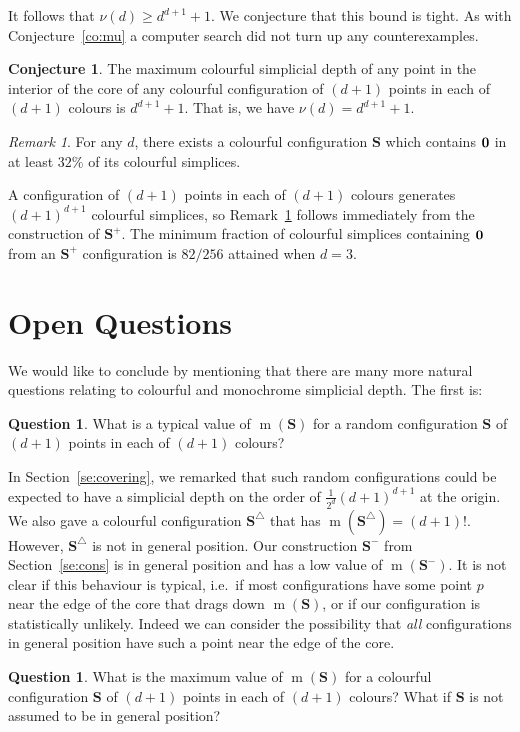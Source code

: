 \documentclass[epsbox,12pt,reqno]{amsart}
\theoremstyle{definition}
\newtheorem{question}[theorem]{Question}
\newtheorem{conjecture}[theorem]{Conjecture}
\theoremstyle{remark}
\newtheorem{remark}[theorem]{Remark}
\def\S{\mathbf{S}}
\def\m{\operatorname{m}}
\def\zero{{\bf 0}}
\begin{document}
It follows that $\nu(d) \ge d^{d+1}+1$. 
We conjecture that this bound is tight.
As with Conjecture~\ref{co:mu} a computer search did not turn up
any counterexamples.
\begin{conjecture}\label{co:nu}
The maximum colourful simplicial depth of any point in the
interior of the core of any colourful configuration of
$(d+1)$ points in each of $(d+1)$ colours is $d^{d+1}+1$.
That is, we have $\nu(d)=d^{d+1}+1$. 
\end{conjecture}

\begin{remark}\label{re:32}
For any $d$, there exists a colourful configuration $\S$ 
which contains $\zero$ in at least $32\%$ of its colourful simplices.
\end{remark}
A configuration of $(d+1)$ points in each of $(d+1)$ colours 
generates $(d+1)^{d+1}$ colourful
simplices, so Remark~\ref{re:32} follows immediately from 
the construction of $\S^+$.  The minimum fraction of colourful
simplices containing $\zero$ from an $\S^+$ configuration is $82/256$ 
attained when $d=3$.

%
%
\section{Open Questions}
We would like to conclude by mentioning that there are many more
natural questions relating to colourful and monochrome simplicial depth.
The first is:
\begin{question}\label{q:mavg}
What is a typical value of $\m(\S)$ for a random 
configuration $\S$ of $(d+1)$ points in each of $(d+1)$ colours?  
\end{question}
In Section~\ref{se:covering}, we remarked that such random
configurations could be expected to have a simplicial depth
on the order of $\frac{1}{2^d}(d+1)^{d+1}$ at the origin.  
We also gave a colourful configuration 
$\S^\triangle$ that has $\m(\S^\triangle)=(d+1)!$.  
However, $\S^\triangle$ is not in general position.  
Our construction $\S^\minus$ from Section~\ref{se:cons} is 
in general position and has a low value of $\m(\S^\minus)$.
It is not clear if this behaviour is typical, 
i.e.~if most configurations have some point $p$ near the edge of
the core that drags down $\m(\S)$, or if our configuration is
statistically unlikely.  Indeed we can consider the
possibility that {\it all} configurations in general position 
have such a point near the edge of the core.
\begin{question}\label{q:mmax}
What is the maximum value of $\m(\S)$ for a colourful configuration $\S$
of $(d+1)$ points in each of $(d+1)$ colours?  What if $\S$ is not
assumed to be in general position?
\end{question}
\end{document}
